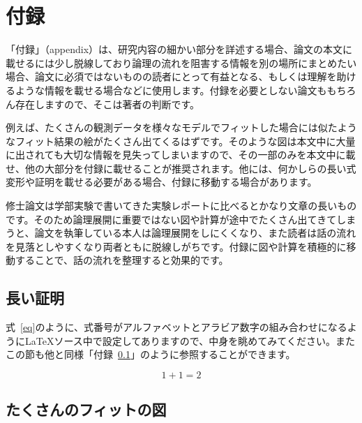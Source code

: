 \chapter*{付録} %

「付録」（appendix）は、研究内容の細かい部分を詳述する場合、論文の本文に載せるには少し脱線しており論理の流れを阻害する情報を別の場所にまとめたい場合、論文に必須ではないものの読者にとって有益となる、もしくは理解を助けるような情報を載せる場合などに使用します。付録を必要としない論文ももちろん存在しますので、そこは著者の判断です。

例えば、たくさんの観測データを様々なモデルでフィットした場合には似たようなフィット結果の絵がたくさん出てくるはずです。そのような図は本文中に大量に出されても大切な情報を見失ってしまいますので、その一部のみを本文中に載せ、他の大部分を付録に載せることが推奨されます。他には、何かしらの長い式変形や証明を載せる必要がある場合、付録に移動する場合があります。

修士論文は学部実験で書いてきた実験レポートに比べるとかなり文章の長いものです。そのため論理展開に重要ではない図や計算が途中でたくさん出てきてしまうと、論文を執筆している本人は論理展開をしにくくなり、また読者は話の流れを見落としやすくなり両者ともに脱線しがちです。付録に図や計算を積極的に移動することで、話の流れを整理すると効果的です。

\setcounter{section}{0} %
\renewcommand{\thesection}{\Alph{section}} %
\setcounter{equation}{0} %
\renewcommand{\theequation}{\Alph{section}.\arabic{equation}}
\setcounter{figure}{0} %
\renewcommand{\thefigure}{\Alph{section}.\arabic{figure}}
\setcounter{table}{0} %
\renewcommand{\thetable}{\Alph{section}.\arabic{table}}

\section{長い証明}
\label{sec:very_long_proof}
式~\eqref{eq}のように、式番号がアルファベットとアラビア数字の組み合わせになるように\LaTeX{}ソース中で設定してありますので、中身を眺めてみてください。またこの節も他と同様「付録~\ref{sec:very_long_proof}」のように参照することができます。

\begin{equation}
  \label{eq}
  1 + 1 = 2
\end{equation}

\section{たくさんのフィットの図}
